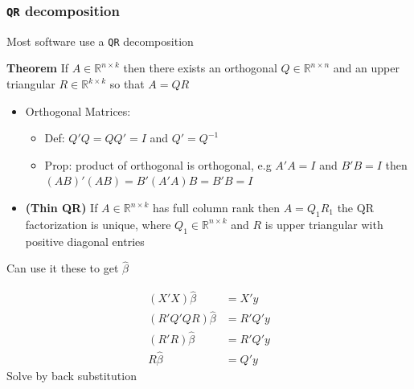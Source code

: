 \documentclass[
  shownotes,
  xcolor={svgnames},
  hyperref={colorlinks,citecolor=DarkBlue,linkcolor=DarkRed,urlcolor=DarkBlue}
  , aspectratio=169]{beamer}
\newenvironment{Shaded}{\begin{snugshade}}{\end{snugshade}}
\begin{document}
\begin{frame}[fragile]
\frametitle{\texttt{QR} decomposition}
Most software use a \texttt{QR} decomposition
 
 \begin{Shaded}
{\bf Theorem}
If $A\in\mathbb{R}^{n\times k}$ then there exists an orthogonal $Q\in \mathbb{R}^{n\times n}$ and an upper triangular $R\in \mathbb{R}^{k\times k}$ so that $A=QR$
\end{Shaded}

\begin{itemize}
  
  \footnotesize
  \item Orthogonal Matrices: 
  \begin{itemize}
    \tiny
  \item Def: $Q'Q=QQ'=I$ and $Q'=Q^{-1}$
  \item Prop: product of orthogonal is orthogonal, e.g $A'A=I$ and $B'B=I$ then $(AB)'(AB)=B'(A'A)B=B'B=I$
  \end{itemize}
  \item {\bf (Thin QR)} If $A\in\mathbb{R}^{n\times k}$   has full column rank then $A=Q_1R_1$ the QR factorization is unique, where $Q_1 \in\mathbb{R}^{n\times k}$ and $R$ is upper triangular with  positive diagonal entries
\end{itemize}

Can use it these to get $\hat \beta$

\footnotesize
\begin{align}
  (X'X) \hat \beta &=  X'y  \\
  (R'Q'QR) \hat \beta &=  R'Q'y  \\
  (R'R) \hat \beta &=  R'Q'y  \\
  R \hat \beta &=  Q'y  
\end{align}
Solve by back substitution

\end{frame}
\end{document}
